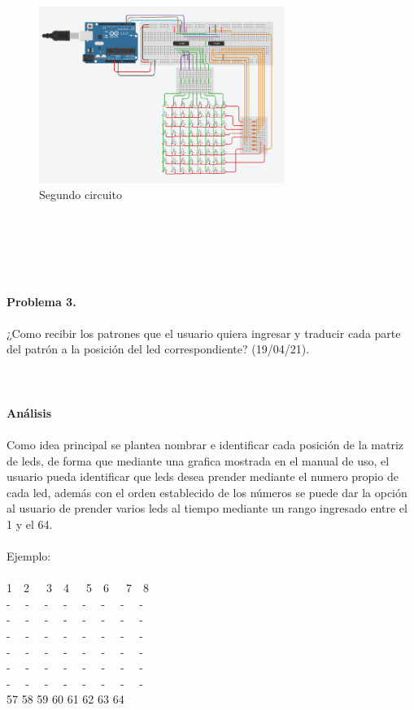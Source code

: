 \documentclass{article}
\begin{document}
\begin{figure}[h]
    \includegraphics[width=8cm]{Imagen2.png}
    \centering
    \caption{Segundo circuito}
    \label{fig:Imagen2}
\end{figure}\\\\

\\
\\
\\
\textbf{\large Problema 3.}\\\\
¿Como recibir los patrones que el usuario quiera ingresar y traducir cada parte del patrón a la posición del led correspondiente? (19/04/21).\\
\\\\\
\\

\textbf{\large Análisis}\\\\
Como idea principal se plantea nombrar e identificar cada posición de la matriz de leds, de forma que mediante una grafica mostrada en el manual de uso, el usuario pueda identificar que leds desea prender mediante el numero propio de cada led, además con el orden establecido de los números se puede dar la opción al usuario de prender varios leds al tiempo mediante un rango ingresado entre el 1 y el 64.
\\
\\
Ejemplo:
\\
\\
1\  \ 2\ \ \ 3\  \ 4\ \ \ 5\  \ 6\ \ \ 7\  \ 8\\ 
- \  \  - \  \ - \  \ - \  \ - \  \ - \  \ - \   \ -\\
- \  \  - \  \ - \  \ - \  \ - \  \ - \  \ - \   \ -\\
- \  \  - \  \ - \  \ - \  \ - \  \ - \  \ - \   \ -\\
- \  \  - \  \ - \  \ - \  \ - \  \ - \  \ - \   \ -\\
- \  \  - \  \ - \  \ - \  \ - \  \ - \  \ - \   \ -\\
- \  \  - \  \ - \  \ - \  \ - \  \ - \  \ - \   \ -\\
57 58 59 60 61 62 63 64\\
\end{document}
